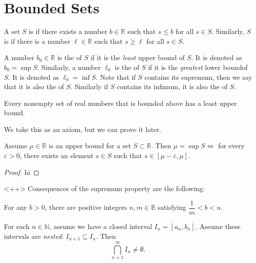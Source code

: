 \section{Bounded Sets}
\begin{definition}
A set $S$ is  if there exists a number $b \in \mathbb{R}$ such that $s \leq b$ for all $s \in S$. Similarly, $S$ is  if there is a number $\ell \in \mathbb{R}$ such that $s \geq \ell$ for all $s \in S$. 

A number $b_0 \in \mathbb{R}$ is the  of $S$ if it is the \emph{least} upper bound of $S$. It is denoted as $b_0 = \sup{S}$. Similarly, a number $\ell_0$ is the  of $S$ if it is the \emph{greatest} lower boundof $S$. It is denoted as $\ell_0 = \inf{S}$. Note that if $S$ contains its supremum, then we say that it is also the  of $S$. Similarly if $S$ contains its infimum, it is also the  of $S$. 
\end{definition}

\begin{theorem}
Every nonempty set of real numbers that is bounded above has a least upper bound. 
\end{theorem}
We take this as an axiom, but we can prove it later. 

\begin{proposition}
Assume $\mu \in \mathbb{R}$ is an upper bound for a set $S \subset \mathbb{R}$. Then $\mu = \sup{S} \Leftrightarrow$ for every $\varepsilon > 0$, there exists an element $s \in S$ such that $s \in [\mu-\varepsilon, \mu]$. 
\end{proposition}
\begin{proof}
	hi
\end{proof}<++>
Consequences of the supremum property are the following:
\begin{theorem}
For any $b>0$, there are positive integers $n,m \in \mathbb{B}$ satisfying $\dfrac{1}{m} < b < n$. 
\end{theorem}
\begin{theorem}
For each $n \in \mathbb{N}$, assume we have a closed interval $I_n = [a_n, b_n]$. Assume these intervals are \emph{nested}: $I_{n+1} \subseteq I_n$. Then 
\[ \bigcap_{n=1}^\infty I_n \neq \emptyset.\]
\end{theorem}

